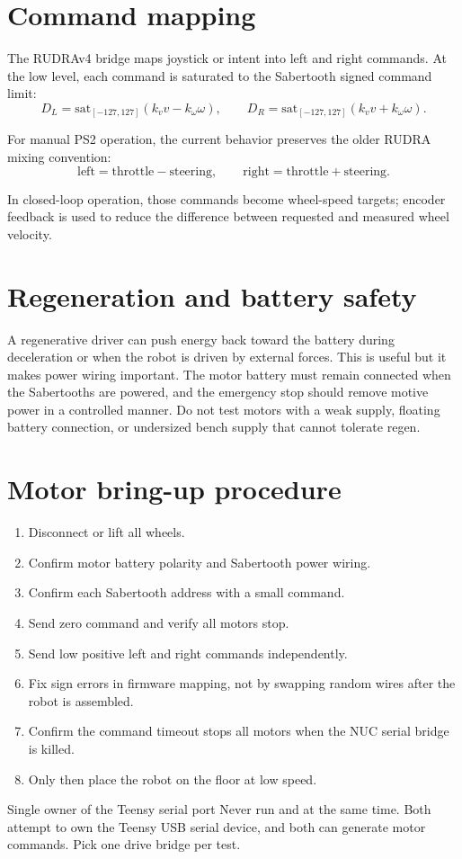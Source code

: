 \section{Command mapping}
The RUDRAv4 bridge maps joystick or  intent into left and right commands.  At the low level, each command is saturated to the Sabertooth signed command limit:
\begin{equation}
D_L=\mathrm{sat}_{[-127,127]}(k_v v - k_\omega \omega), \qquad
D_R=\mathrm{sat}_{[-127,127]}(k_v v + k_\omega \omega).
\end{equation}

For manual PS2 operation, the current behavior preserves the older RUDRA mixing convention:
\begin{equation}
\mathrm{left}=\mathrm{throttle}-\mathrm{steering}, \qquad
\mathrm{right}=\mathrm{throttle}+\mathrm{steering}.
\end{equation}

In closed-loop operation, those commands become wheel-speed targets; encoder feedback is used to reduce the difference between requested and measured wheel velocity.

\section{Regeneration and battery safety}
A regenerative driver can push energy back toward the battery during deceleration or when the robot is driven by external forces.  This is useful but it makes power wiring important.  The motor battery must remain connected when the Sabertooths are powered, and the emergency stop should remove motive power in a controlled manner.  Do not test motors with a weak supply, floating battery connection, or undersized bench supply that cannot tolerate regen.

\section{Motor bring-up procedure}
\begin{enumerate}
  \item Disconnect or lift all wheels.
  \item Confirm motor battery polarity and Sabertooth power wiring.
  \item Confirm each Sabertooth address with a small command.
  \item Send zero command and verify all motors stop.
  \item Send low positive left and right commands independently.
  \item Fix sign errors in firmware mapping, not by swapping random wires after the robot is assembled.
  \item Confirm the command timeout stops all motors when the NUC serial bridge is killed.
  \item Only then place the robot on the floor at low speed.
\end{enumerate}

\begin{safetybox}{Single owner of the Teensy serial port}
Never run  and  at the same time.  Both attempt to own the Teensy USB serial device, and both can generate motor commands.  Pick one drive bridge per test.
\end{safetybox}
